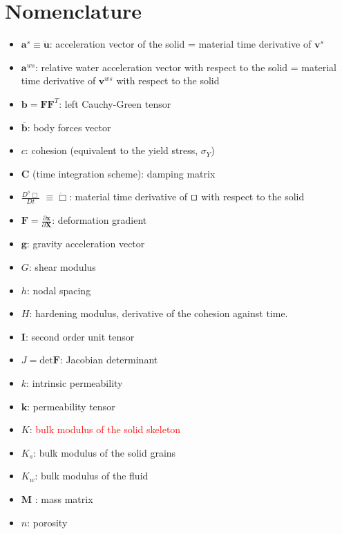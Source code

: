 \documentclass[twocolumn]{svjour3}          %
\begin{document}


\section*{Nomenclature}
\label{nom}

\begin{itemize}
\item $\boldsymbol{a}^s \equiv \boldsymbol{\ddot{u}}$: acceleration vector of the solid = material time derivative of $\boldsymbol{v}^s$
\item $\boldsymbol{a}^{ws}$: relative water acceleration vector with respect to the solid = material time derivative of $\boldsymbol{v}^{ws}$ with respect to the solid 
\item $\boldsymbol{b}=\boldsymbol{F}\boldsymbol{F}^{T}$: left Cauchy-Green tensor
\item $\boldsymbol{\overline{b}}$: body forces vector
\item $c$: cohesion (equivalent to the yield stress, $\sigma_Y$)
\item $\boldsymbol{C}$ (time integration scheme): damping matrix
\item $\frac{D^s\Box}{Dt}$ $\equiv \dot\Box$: material time derivative of $\qed$ with respect to the solid
\item $\boldsymbol{F}=\frac{\partial\boldsymbol{x}}{\partial\boldsymbol{X}}$: deformation gradient
\item $\boldsymbol{g}$: gravity acceleration vector
\item $G$: shear modulus
\item $h$: nodal spacing
\item $H$: hardening modulus, derivative of the cohesion against time.
\item $\boldsymbol{I}$: second order unit tensor
\item $J=\mbox{det}\boldsymbol{F}$: Jacobian determinant
\item $k$: intrinsic permeability
\item $\boldsymbol{k}$: permeability tensor
\item $K$: \textcolor{red}{bulk modulus of the solid skeleton}
\item $K_s$: bulk modulus of the solid grains
\item $K_w$: bulk modulus of the fluid
\item $\boldsymbol{M}$ : mass matrix
\item $n$: porosity

\end{itemize}
\end{document}
